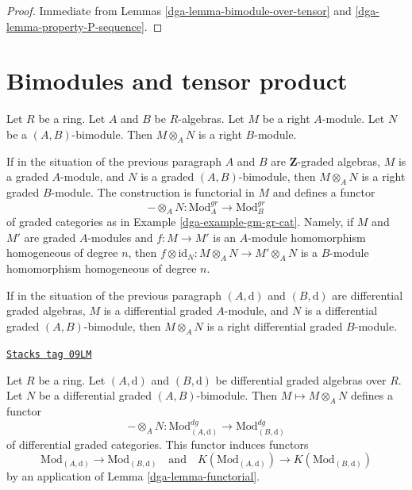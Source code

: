 \begin{proof}

Immediate from Lemmas \ref{dga-lemma-bimodule-over-tensor} and
\ref{dga-lemma-property-P-sequence}.
\end{proof}

\section{Bimodules and tensor product}
\label{dga-section-bimodules-tensor}
Let $R$ be a ring. Let $A$ and $B$ be $R$-algebras. Let $M$ be a right
$A$-module. Let $N$ be a $(A, B)$-bimodule. Then
$M \otimes_A N$ is a right $B$-module.

\medskip\noindent
If in the situation of the previous paragraph
$A$ and $B$ are $\mathbf{Z}$-graded algebras,
$M$ is a graded $A$-module, and $N$ is a graded $(A, B)$-bimodule,
then $M \otimes_A N$ is a right graded $B$-module. The construction
is functorial in $M$ and defines a functor
$$
- \otimes_A N :
\text{Mod}^{gr}_A
\longrightarrow
\text{Mod}^{gr}_B
$$
of graded categories as in Example \ref{dga-example-gm-gr-cat}. Namely, if
$M$ and $M'$ are graded $A$-modules and $f : M \to M'$ is an $A$-module
homomorphism homogeneous of degree $n$, then
$f \otimes \text{id}_N : M \otimes_A N \to M' \otimes_A N$
is a $B$-module homomorphism homogeneous of degree $n$.

\medskip\noindent
If in the situation of the previous paragraph
$(A, \text{d})$ and $(B, \text{d})$ are differential graded algebras,
$M$ is a differential graded $A$-module, and $N$ is a differential
graded $(A, B)$-bimodule, then $M \otimes_A N$ is a right
differential graded $B$-module.

\begin{lemma}[Tensor]
\label{dga-lemma-tensor}
\href{https://stacks.math.columbia.edu/tag/09LM}{\texttt{Stacks tag 09LM}}

Let $R$ be a ring. Let $(A, \text{d})$ and $(B, \text{d})$
be differential graded algebras over $R$. Let $N$ be a
differential graded $(A, B)$-bimodule. Then
$M \mapsto M \otimes_A N$ defines a functor
$$
- \otimes_A N :
\text{Mod}^{dg}_{(A, \text{d})}
\longrightarrow
\text{Mod}^{dg}_{(B, \text{d})}
$$
of differential graded categories. This functor induces functors
$$
\text{Mod}_{(A, \text{d})} \to \text{Mod}_{(B, \text{d})}
\quad\text{and}\quad
K(\text{Mod}_{(A, \text{d})}) \to K(\text{Mod}_{(B, \text{d})})
$$
by an application of Lemma \ref{dga-lemma-functorial}.
\end{lemma}


